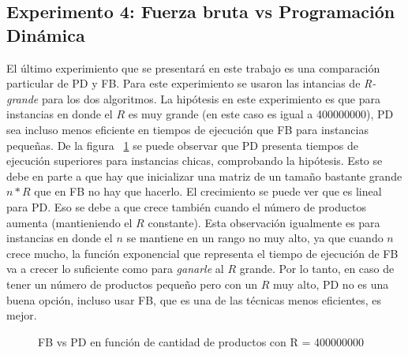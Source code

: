 \documentclass[10pt,a4paper]{article}
\begin{document}
\subsection{Experimento 4: Fuerza bruta vs Programación Dinámica}
El último experimiento que se presentará en este trabajo es una comparación particular de PD y FB. Para este experimiento se usaron las intancias de \textit{R-grande} para los dos algoritmos. La hipótesis en este experimiento es que para instancias en donde el $R$ es muy grande (en este caso es igual a 400000000), PD sea incluso menos eficiente en tiempos de ejecución que FB para instancias pequeñas. De la figura ~\ref{fig:fb-pd-R-grande} se puede observar que PD presenta tiempos de ejecución superiores para instancias chicas, comprobando la hipótesis. Esto se debe en parte a que hay que inicializar una matriz de un tamaño bastante grande $n * R$ que en FB no hay que hacerlo. El crecimiento se puede ver que es lineal para PD. Eso se debe a que crece también cuando el número de productos aumenta (mantieniendo el $R$ constante). Esta observación igualmente es para instancias en donde el $n$ se mantiene en un rango no muy alto, ya que cuando $n$ crece mucho, la función exponencial que representa el tiempo de ejecución de FB va a crecer lo suficiente como para \textit{ganarle} al $R$ grande. Por lo tanto, en caso de tener un número de productos pequeño pero con un $R$ muy alto, PD no es una buena opción, incluso usar FB, que es una de las técnicas menos eficientes, es mejor.


\begin{figure}[!ht]
        \centering
        
\caption{FB vs PD en función de cantidad de productos con R = 400000000}
\label{fig:fb-pd-R-grande}
\end{figure}
\end{document}
